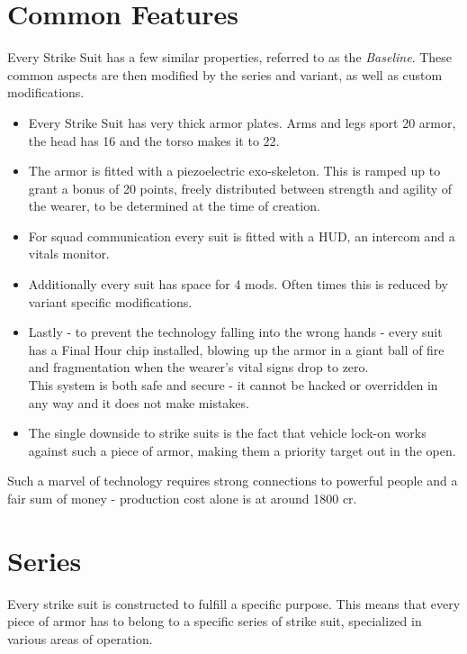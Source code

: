 \documentclass[12pt,a4paper,openany]{book}
\begin{document}
	\section{Common Features}
	Every Strike Suit has a few similar properties, referred to as the \emph{Baseline}. These common aspects are then modified by the series and variant, as well as custom modifications.\par
	\begin{itemize}
		\item Every Strike Suit has very thick armor plates. Arms and legs sport 20 armor, the head has 16 and the torso makes it to 22.
		\item The armor is fitted with a piezoelectric exo-skeleton. This is ramped up to grant a bonus of 20 points, freely distributed between strength and agility of the wearer, to be determined at the time of creation.
		\item For squad communication every suit is fitted with a HUD, an intercom and a vitals monitor.
		\item Additionally every suit has space for 4 mods. Often times this is reduced by variant specific modifications.
		\item Lastly - to prevent the technology falling into the wrong hands - every suit has a Final Hour chip installed, blowing up the armor in a giant ball of fire and fragmentation when the wearer's vital signs drop to zero.\\
		This system is both safe and secure - it cannot be hacked or overridden in any way and it does not make mistakes.
		\item The single downside to strike suits is the fact that vehicle lock-on works against such a piece of armor, making them a priority target out in the open.
	\end{itemize}
	\par
	Such a marvel of technology requires strong connections to powerful people and a fair sum of money - production cost alone is at around 1800 cr.

	\section{Series}
	Every strike suit is constructed to fulfill a specific purpose. This means that every piece of armor has to belong to a specific series of strike suit, specialized in various areas of operation.

    \begin{multicols}{2}
    \end{multicols}
    
\end{document}
